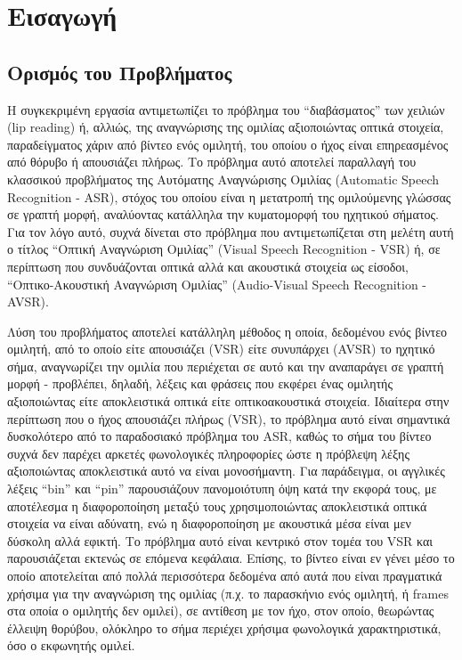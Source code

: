 \section{Εισαγωγή}
\label{Introduction}
\subsection{Ορισμός του Προβλήματος}

Η συγκεκριμένη εργασία αντιμετωπίζει το πρόβλημα του ``διαβάσματος'' των χειλιών (lip reading) ή, αλλιώς, της αναγνώρισης της ομιλίας αξιοποιώντας οπτικά στοιχεία, παραδείγματος χάριν από βίντεο ενός ομιλητή, του οποίου ο ήχος είναι επηρεασμένος από θόρυβο ή απουσιάζει πλήρως. Το πρόβλημα αυτό αποτελεί παραλλαγή του κλασσικού προβλήματος της Αυτόματης Αναγνώρισης Ομιλίας (Automatic Speech Recognition - ASR), στόχος του οποίου είναι η μετατροπή της ομιλούμενης γλώσσας σε γραπτή μορφή, αναλύοντας κατάλληλα την κυματομορφή του ηχητικού σήματος. Για τον λόγο αυτό, συχνά δίνεται στο πρόβλημα που αντιμετωπίζεται στη μελέτη αυτή ο τίτλος ``Οπτική Αναγνώριση Ομιλίας'' (Visual Speech Recognition - VSR) ή, σε περίπτωση που συνδυάζονται οπτικά αλλά και ακουστικά στοιχεία ως είσοδοι, ``Οπτικο-Ακουστική Αναγνώριση Ομιλίας'' (Audio-Visual Speech Recognition - AVSR).

Λύση του προβλήματος αποτελεί κατάλληλη μέθοδος η οποία, δεδομένου ενός βίντεο ομιλητή, από το οποίο είτε απουσιάζει (VSR) είτε συνυπάρχει (AVSR) το ηχητικό σήμα, αναγνωρίζει την ομιλία που περιέχεται σε αυτό και την αναπαράγει σε γραπτή μορφή - προβλέπει, δηλαδή, λέξεις και φράσεις που εκφέρει ένας ομιλητής αξιοποιώντας είτε αποκλειστικά οπτικά είτε οπτικοακουστικά στοιχεία. Ιδιαίτερα στην περίπτωση που ο ήχος απουσιάζει πλήρως (VSR), το πρόβλημα αυτό είναι σημαντικά δυσκολότερο από το παραδοσιακό πρόβλημα του ASR, καθώς το σήμα του βίντεο συχνά δεν παρέχει αρκετές φωνολογικές πληροφορίες ώστε η πρόβλεψη λέξης αξιοποιώντας αποκλειστικά αυτό να είναι μονοσήμαντη. Για παράδειγμα, οι αγγλικές λέξεις ``bin'' και ``pin'' παρουσιάζουν πανομοιότυπη όψη κατά την εκφορά τους, με αποτέλεσμα η διαφοροποίηση μεταξύ τους χρησιμοποιώντας αποκλειστικά οπτικά στοιχεία να είναι αδύνατη, ενώ η διαφοροποίηση με ακουστικά μέσα είναι μεν δύσκολη αλλά εφικτή. Το πρόβλημα αυτό είναι κεντρικό στον τομέα του VSR και παρουσιάζεται εκτενώς σε επόμενα κεφάλαια. Επίσης, το βίντεο είναι εν γένει μέσο το οποίο αποτελείται από πολλά περισσότερα δεδομένα από αυτά που είναι πραγματικά χρήσιμα για την αναγνώριση της ομιλίας (π.χ. το παρασκήνιο ενός ομιλητή, ή frames στα οποία ο ομιλητής δεν ομιλεί), σε αντίθεση με τον ήχο, στον οποίο, θεωρώντας έλλειψη θορύβου, ολόκληρο το σήμα περιέχει χρήσιμα φωνολογικά χαρακτηριστικά, όσο ο εκφωνητής ομιλεί.

